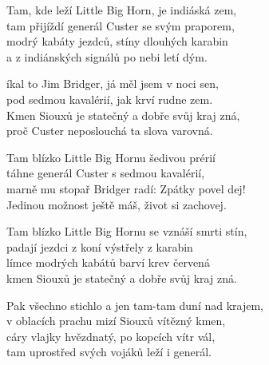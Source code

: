 
\ve
Tam, kde leží Little Big Horn, je indiáská zem,\\
tam přijíždí generál Custer se svým praporem,\\
modrý kabáty jezdců, stíny dlouhých karabin\\
a z indiánských signálů po nebi letí dým.

\cho
{}íkal to Jim Bridger, já měl jsem v noci sen,\\
pod sedmou kavalérií, jak krví rudne zem.\\
Kmen Siouxů je statečný a dobře svůj kraj zná,\\
proč Custer neposlouchá ta slova varovná.

\ve
Tam blízko Little Big Hornu šedivou prérií\\
táhne generál Custer s sedmou kavalérií,\\
marně mu stopař Bridger radí: Zpátky povel dej!\\
Jedinou možnost ještě máš, život si zachovej.

\cho

\ve
Tam blízko Little Big Hornu se vznáší smrti stín,\\
padají jezdci z koní výstřely z karabin\\
límce modrých kabátů barví krev červená\\
kmen Siouxů je statečný a dobře svůj kraj zná.

\cho

\ve
Pak všechno stichlo a jen tam-tam duní nad krajem,\\
v oblacích prachu mizí Siouxů vítězný kmen,\\
cáry vlajky hvězdnatý, po kopcích vítr vál,\\
tam uprostřed svých vojáků leží i generál.

\cho

\esong